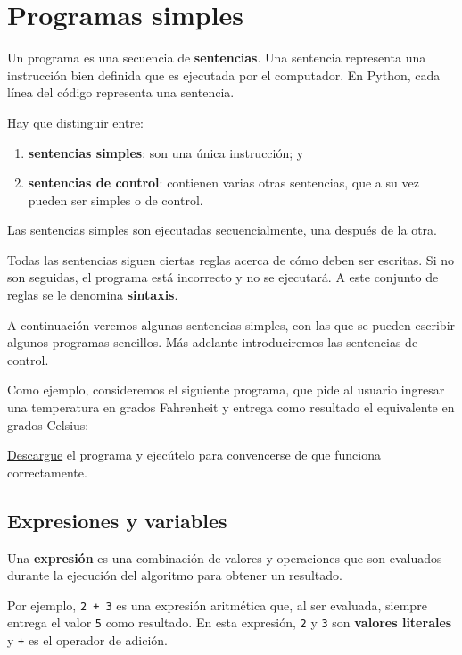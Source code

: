 \section{Programas simples}

Un programa es una secuencia de \textbf{sentencias}. Una sentencia
representa una instrucción bien definida que es ejecutada por el
computador. En Python, cada línea del código representa una sentencia.

Hay que distinguir entre:

\begin{enumerate}
\item
  \textbf{sentencias simples}: son una única instrucción; y
\item
  \textbf{sentencias de control}: contienen varias otras sentencias, que
  a su vez pueden ser simples o de control.
\end{enumerate}

Las sentencias simples son ejecutadas secuencialmente, una después de la
otra.

Todas las sentencias siguen ciertas reglas acerca de cómo deben ser
escritas. Si no son seguidas, el programa está incorrecto y no se
ejecutará. A este conjunto de reglas se le denomina \textbf{sintaxis}.

A continuación veremos algunas sentencias simples, con las que se pueden
escribir algunos programas sencillos. Más adelante introduciremos las
sentencias de control.

Como ejemplo, consideremos el siguiente programa, que pide al usuario
ingresar una temperatura en grados Fahrenheit y entrega como resultado
el equivalente en grados Celsius:

\href{../\_static/programas/temperatura.py}{Descargue} el programa y
ejecútelo para convencerse de que funciona correctamente.

\subsection{Expresiones y variables}

Una \textbf{expresión} es una combinación de valores y operaciones que
son evaluados durante la ejecución del algoritmo para obtener un
resultado.

Por ejemplo, \lstinline!2 + 3! es una expresión aritmética que, al ser
evaluada, siempre entrega el valor \lstinline!5! como resultado. En esta
expresión, \lstinline!2! y \lstinline!3! son \textbf{valores literales}
y \lstinline!+! es el operador de adición.

